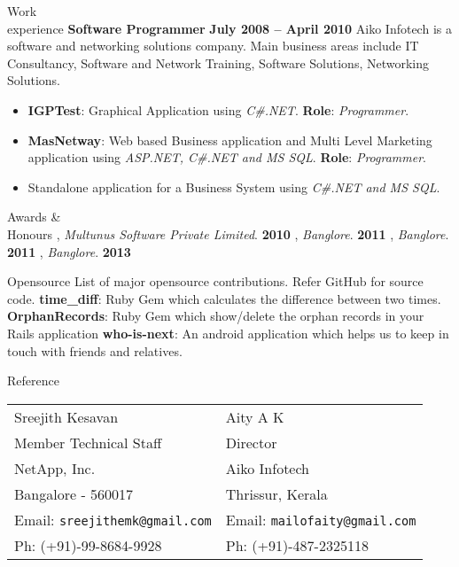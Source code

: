 \documentclass{resume}
\begin{document}
\begin{category}{Work \\experience}
  \citemnobullet \textbf{Software Programmer} \hfill \textbf{July 2008 -- April 2010}
  \citemnobullet Aiko Infotech is a software and networking solutions
  company. Main business areas include IT Consultancy, Software and Network
  Training, Software Solutions, Networking Solutions.
  \begin{itemize} 
  \item \textbf{IGPTest}: Graphical Application using {\em C\#.NET}. \textbf{Role}: {\em Programmer}.
  \item \textbf{MasNetway}: Web based Business application and Multi Level Marketing
    application using {\em ASP.NET, C\#.NET and MS SQL}. \textbf{Role}: {\em Programmer}.
  \item Standalone application for a Business System using {\em C\#.NET and MS SQL}.
  \end{itemize}
\end{category}


\begin{category}{Awards \&\\ Honours}
  , {\em Multunus Software Private Limited}. \hfill \textbf{2010}
  , {\em Banglore}. \hfill \textbf{2011}
  , {\em Banglore}. \hfill \textbf{2011}
  , {\em Banglore}. \hfill \textbf{2013}
\end{category}



\begin{category}{Opensource}
  \citemnobullet List of major opensource contributions. Refer GitHub for source code.
  \citembullet \textbf{time\_diff}: Ruby Gem which calculates the difference between two times.
  \citembullet \textbf{OrphanRecords}: Ruby Gem which show/delete the orphan records in your Rails application
  \citembullet \textbf{who-is-next}: An android application which helps us to keep in touch with friends and relatives.
\end{category}


\begin{category}{Reference}
  \citemnobullet \\
  \begin{tabular}{ll}Sreejith Kesavan&Aity A K\\
    Member Technical Staff&Director\\
    NetApp, Inc.&Aiko Infotech\\
    Bangalore - 560017&Thrissur, Kerala\\
    Email: \mbox{\small\tt sreejithemk@gmail.com}&Email: \mbox{\small\tt mailofaity@gmail.com}\\
    Ph: (+91)-99-8684-9928&Ph: (+91)-487-2325118
  \end{tabular}
\end{category}
\end{document}
